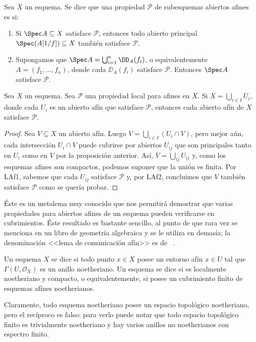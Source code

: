 \begin{mydef}
	Sea $X$ un esquema.
	Se dice que una propiedad $\mathcal{P}$ de subesquemas abiertos afines es  si:
	\begin{enumerate}[{LAf}1.]
		\item Si $\Spec A \subseteq X$ satisface $\mathcal{P}$, entonces todo abierto principal $\Spec(A[1/f]) \subseteq X$
			también satisface $\mathcal{P}$.
		\item Supongamos que $\Spec A = \bigcup_{i=1}^{n} \DD_A(f_i) $, o equivalentemente $A = (f_1, \dots, f_n)$,
			donde cada $\DD_A(f_i)$ satisface $\mathcal{P}$.
			Entonces $\Spec A$ satisface $\mathcal{P}$.
	\end{enumerate}
\end{mydef}
\begin{lem}
	Sea $X$ un esquema.
	Sea $\mathcal{P}$ una propiedad local para afines en $X$.
	Si $X = \bigcup_{i\in I} U_i$, donde cada $U_i$ es un abierto afín que satisface $\mathcal{P}$,
	entonces cada abierto afín de $X$ satisface $\mathcal{P}$.
\end{lem}
\begin{proof}
	Sea $V \subseteq X$ un abierto afín.
	Luego $V = \bigcup_{i\in I} (U_i \cap V)$, pero mejor aún, cada intersección $U_i \cap V$ puede cubrirse por abiertos $U_{ij}$
	que son principales tanto en $U_i$ como en $V$ por la proposición anterior.
	Así, $V = \bigcup_{ij} U_{ij}$ y, como los esquemas afines son compactos, podemos suponer que la unión es finita.
	Por LAf1, sabemos que cada $U_{ij}$ satisface $\mathcal{P}$ y, por LAf2, concluimos que $V$ también satisface $\mathcal{P}$ como se quería probar.
\end{proof}
Éste es un metalema muy conocido que nos permitirá demostrar que varias propiedades para abiertos afines de un esquema
pueden verificarse en cubrimientos.
Éste resultado es bastante sencillo, al punto de que rara vez se menciona en un libro de geometría algebraica y se le utiliza en demasía;
la denominación <<lema de comunicación afín>> es de \citeauthor{vakil:rising_sea}~\cite{vakil:rising_sea}.

\begin{mydef}
	Un esquema $X$ se dice 
	si todo punto $x \in X$ posee un entorno afín $x \in U$ tal que $\Gamma(U, \mathscr{O}_X)$ es un anillo noetheriano.
	Un esquema se dice  si es localmente noetheriano y compacto, o equivalentemente,
	si posee un cubrimiento finito de esquemas afínes noetherianos.
\end{mydef}
Claramente, todo esquema noetheriano posee un espacio topológico noetheriano, pero el recíproco es falso:
para verlo puede notar que todo espacio topológico finito es trivialmente noetheriano y hay varios anillos no noetherianos con espectro finito.

